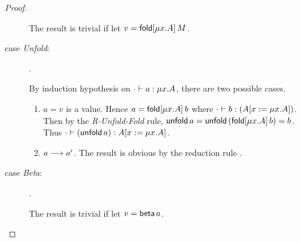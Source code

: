 \begin{proof}
\begin{description}
  The result is trivial if let $v=\mathsf{fold}[\mu x.A]\,M$.
\item[case \emph{Unfold}:] %
                      {}.

  By induction hypothesis on $\cdot \vdash a:\mu x.A$, there are
  two possible cases.
  \begin{enumerate}
  \item $a=v$ is a value. Hence $a=\mathsf{fold}[\mu x.A]\,b$ where $\cdot \vdash b:(A[x:=\mu x.A])$. Then by the \emph{R-Unfold-Fold} rule, $\mathsf{unfold}\,a=\mathsf{unfold}\,(\mathsf{fold}[\mu x.A]\,b) = b$. Thus $\cdot \vdash (\mathsf{unfold}\,a):A[x:=\mu x.A]$.
  \item $a \longrightarrow a'$. The result is obvious by the
    reduction rule 
    .
  \end{enumerate}
\item[case \emph{Beta}:] 
    .

  The result is trivial if let $v=\mathsf{beta}\,a$.
\end{description}

\end{proof}
